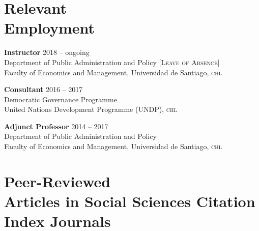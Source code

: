 \documentclass[letterpaper,margin]{res}
\begin{document}
\begin{resume}

 \section{\footnotesize Relevant \\ Employment}
 
{\bf \small Instructor} \hfill {\small 2018 -- ongoing}\\
{\small Department of Public Administration and Policy} \hfill {\scshape \footnotesize [Leave of Absence]}\\
{\small Faculty of Economics and Management, Universidad de Santiago, {\scshape chl}}


{\bf \small Consultant} \hfill {\small 2016 -- 2017}\\
{\small Democratic Governance Programme}\\
{\small United Nations Development Programme ({\scshape UNDP}), {\scshape chl}}

{\small \bf Adjunct Professor} \hfill {\small 2014 -- 2017}\\
{\small Department of Public Administration and Policy}\\
{\small Faculty of Economics and Management, Universidad de Santiago, {\scshape chl}}



\section{\footnotesize Peer-Reviewed \\ Articles in Social Sciences Citation \\ Index Journals}


\end{resume}
\end{document}
